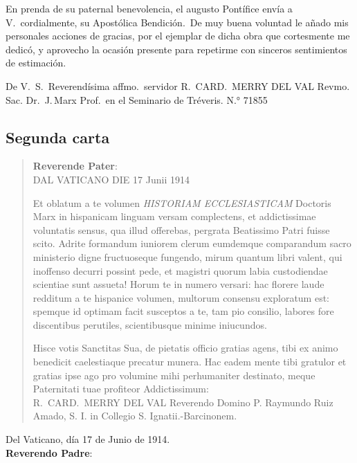 \raggedbottom{} \documentclass[12pt, a4paper]{book}
\begin{document}
En prenda de su paternal benevolencia, el augusto Pontífice envía a V.\ cordialmente, su Apostólica Bendición.\  De muy buena voluntad le añado mis personales acciones de gracias, por el ejemplar de dicha obra que cortesmente me dedicó, y aprovecho la ocasión presente para repetirme con sinceros sentimientos de estimación.

De V.\ S.\ Reverendísima affmo.\ servidor
R.\, CARD.\, MERRY DEL VAL
Revmo. Sac. Dr.\, J.\,Marx Prof.\ en el Seminario de Tréveris.
N.° 71855
\subsection{Segunda carta}
\begin{quotation}
  \begin{flushright}
    \textbf{Reverende Pater}:\\
    DAL VATICANO DIE 17 Junii 1914
  \end{flushright}

  \noindent Et oblatum a te volumen \textit{HISTORIAM ECCLESIASTICAM} Doctoris Marx in hispanicam linguam versam complectens, et addictissimae voluntatis sensus, qua illud offerebas, pergrata Beatissimo Patri fuisse scito. Adrite formandum iuniorem clerum eumdemque comparandum sacro ministerio digne fructuoseque fungendo, mirum quantum libri valent, qui inoffenso decurri possint pede, et magistri quorum labia custodiendae scientiae sunt assueta! Horum te in numero versari: hac florere laude redditum a te hispanice volumen, multorum consensu exploratum est: spemque id optimam facit susceptos a te, tam pio consilio, labores fore discentibus perutiles, scientibusque minime iniucundos.

  Hisce votis Sanctitas Sua, de pietatis officio gratias agens, tibi ex animo benedicit caelestiaque precatur munera. Hac eadem mente tibi gratulor et gratias ipse ago pro volumine mihi perhumaniter destinato, meque Paternitati tuae profiteor Addictissimum:\\
  R.\ CARD.\ MERRY DEL VAL
  Reverendo Domino P. Raymundo Ruiz Amado, S. I. in Collegio
  S. Ignatii.-Barcinonem.
\end{quotation}
\newpage
\begin{flushright}
  Del Vaticano, día 17 de Junio de 1914.\\
  \textbf{Reverendo Padre}:
\end{flushright}
\end{document}
